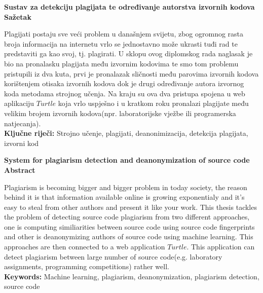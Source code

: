 \begin{center}
\textbf{Sustav za detekciju plagijata te određivanje autorstva izvornih kodova}
\textbf{Sažetak}
\end{center}

	Plagijati postaju sve veći problem u današnjem svijetu, zbog ogromnog rasta broja informacija na internetu vrlo se jednostavno može ukrasti tuđi rad te predstaviti ga kao svoj, tj. plagirati. U sklopu ovog diplomskog rada naglasak je bio na pronalasku plagijata među izvornim kodovima te smo tom problemu pristupili iz dva kuta, prvi je pronalazak sličnosti među parovima izvornih kodova korištenjem otisaka izvornih kodova dok je drugi određivanje autora izvornog koda metodama strojnog učenja. Na kraju su ova dva pristupa spojena u web aplikaciju $Turtle$ koja vrlo uspješno i u kratkom roku pronalazi plagijate među velikim brojem izvornih kodova(npr. laboratorijske vježbe ili programerska natjecanja). \\
	
\noindent \textbf{Ključne riječi:} Strojno učenje, plagijati, deanonimizacija, detekcija plagijata, izvorni kod

\begin{center}
\textbf{System for plagiarism detection and deanonymization of source code}
\textbf{Abstract}
\end{center}

	Plagiarism is becoming bigger and bigger problem in today society, the reason behind it is that information available online is growing exponentialy and it's easy to steal from other authors and present it like your work. This thesis tackles the problem of detecting source code plagiarism from two different approaches, one is computing similiarities between source code using source code fingerprints and other is deanonymizing authors of source code using machine learning. This approaches are then connected to a web application $Turtle$. This application can detect plagiarism between large number of source code(e.g. laboratory assignments, programming competitions) rather well. \\
	
\noindent \textbf{Keywords:} Machine learning, plagiarism, deanonymization, plagiarism detection, source code